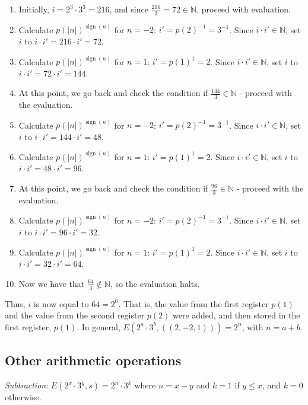 \documentclass{article}
\DeclareMathOperator{\sign}{sign}
\begin{document}
\begin{enumerate}
\item Initially, $i = 2^3 \cdot 3^3 = 216$, and since $\frac{216}{3} = 72 \in \mathbb{N}$, proceed with evaluation.
\item Calculate $p(|n|)^{\sign(n)}$ for $n = -2$: $i' = p(2)^{-1} = 3^{-1}$. Since $i \cdot i' \in \mathbb{N}$, set $i$ to $i \cdot i' = 216 \cdot i' = 72$.
\item Calculate $p(|n|)^{\sign(n)}$ for $n = 1$: $i' = p(1)^{1} = 2$. Since $i \cdot i' \in \mathbb{N}$, set $i$ to $i \cdot i' = 72 \cdot i' = 144$.
\item At this point, we go back and check the condition if $\frac{144}{3} \in \mathbb{N}$ - proceed with the evaluation.
\item Calculate $p(|n|)^{\sign(n)}$ for $n = -2$: $i' = p(2)^{-1} = 3^{-1}$. Since $i \cdot i' \in \mathbb{N}$, set $i$ to $i \cdot i' = 144 \cdot i' = 48$.
\item Calculate $p(|n|)^{\sign(n)}$ for $n = 1$: $i' = p(1)^{1} = 2$. Since $i \cdot i' \in \mathbb{N}$, set $i$ to $i \cdot i' = 48 \cdot i' = 96$.
\item At this point, we go back and check the condition if $\frac{96}{3} \in \mathbb{N}$ - proceed with the evaluation.
\item Calculate $p(|n|)^{\sign(n)}$ for $n = -2$: $i' = p(2)^{-1} = 3^{-1}$. Since $i \cdot i' \in \mathbb{N}$, set $i$ to $i \cdot i' = 96 \cdot i' = 32$.
\item Calculate $p(|n|)^{\sign(n)}$ for $n = 1$: $i' = p(1)^{1} = 2$. Since $i \cdot i' \in \mathbb{N}$, set $i$ to $i \cdot i' = 32 \cdot i' = 64$.
\item Now we have that $\frac{64}{3} \notin \mathbb{N}$, so the evaluation halts.
\end{enumerate}

Thus, $i$ is now equal to $64 = 2^6$. That is, the value from the first register $p(1)$ and the value from the second register $p(2)$ were added, and then stored in the first register, $p(1)$. In general, $E(2^a \cdot 3^b, ((2, -2, 1))) = 2^n$, with $n = a + b$.

\subsection{Other arithmetic operations}

\textit{Subtraction}: $E(2^x \cdot 3^y, s) = 2^n \cdot 3^k$ where $n = x - y$ and $k=1$ if $y \leq x$, and $k=0$ otherwise.
\end{document}
